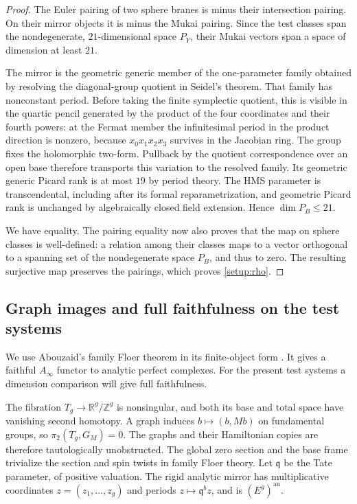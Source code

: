 \documentclass[11pt]{article}
\numberwithin{equation}{section}
\theoremstyle{definition}
\theoremstyle{remark}
\newcommand{\R}{\mathbb R}
\newcommand{\Z}{\mathbb Z}
\begin{document}
\begin{proof}
The Euler pairing of two sphere branes is minus their intersection
pairing.  On their mirror objects it is minus the Mukai pairing.
Since the test classes span the nondegenerate, $21$-dimensional space
$P_Y$, their Mukai vectors span a space of dimension at least $21$.

The mirror is the geometric generic member of the one-parameter family
obtained by resolving the diagonal-group quotient in Seidel's theorem.
That family has nonconstant period.  Before taking the finite symplectic
quotient, this is visible in the quartic pencil generated by the product
of the four coordinates and their fourth powers: at the Fermat member
the infinitesimal period in the product direction is nonzero, because
$x_0x_1x_2x_3$ survives in the Jacobian ring.  The group fixes the
holomorphic two-form.  Pullback by the quotient correspondence over an
open base therefore transports this variation to the resolved family.
Its geometric generic Picard rank is at most $19$ by period theory.
The HMS parameter is transcendental, including after its formal
reparametrization, and geometric Picard rank is unchanged by
algebraically closed field extension.  Hence $\dim P_B\le21$.

We have equality.  The pairing equality now also proves that the map on
sphere classes is well-defined: a relation among their classes maps to
a vector orthogonal to a spanning set of the nondegenerate space $P_B$,
and thus to zero.  The resulting surjective map preserves the pairings,
which proves \eqref{setup:rho}.
\end{proof}

\subsection{Graph images and full faithfulness on the test systems}

We use Abouzaid's family Floer theorem in its finite-object form
\cite[Theorem~2.10 and Appendix~A]{AbouzaidFaithful}.  It gives a faithful
$A_\infty$ functor to analytic perfect complexes.  For the present test
systems a dimension comparison will give full faithfulness.

The fibration $T_g\to\R^g/\Z^g$ is nonsingular, and both its base and
total space have vanishing second homotopy.  A graph induces
$b\mapsto(b,Mb)$ on fundamental groups, so
$\pi_2(T_g,G_M)=0$.  The graphs and their Hamiltonian copies are
therefore tautologically unobstructed.  The global zero section and
the base frame trivialize the section and spin twists in family Floer
theory.  Let $\mathfrak q$ be the Tate parameter, of positive valuation.
The rigid analytic mirror has multiplicative coordinates
$z=(z_1,\ldots,z_g)$ and periods $z\mapsto\mathfrak q^b z$, and is
$(E^g)^{\mathrm{an}}$.
\end{document}
